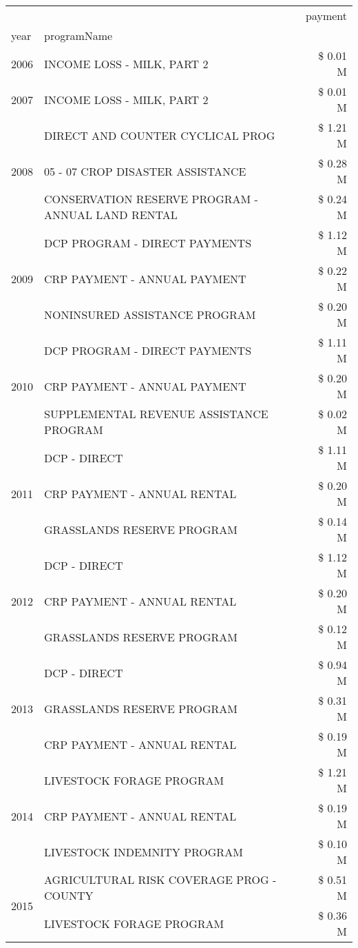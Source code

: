 \begin{tabular}{llr}
\toprule
 &  & payment \\
year & programName &  \\
\midrule
2006 & INCOME LOSS - MILK, PART 2 & \$ 0.01 M \\
\cline{1-3}
2007 & INCOME LOSS - MILK, PART 2 & \$ 0.01 M \\
\cline{1-3}
\multirow[t]{3}{*}{2008} & DIRECT AND COUNTER CYCLICAL PROG & \$ 1.21 M \\
 & 05 - 07 CROP DISASTER ASSISTANCE & \$ 0.28 M \\
 & CONSERVATION RESERVE PROGRAM - ANNUAL LAND RENTAL & \$ 0.24 M \\
\cline{1-3}
\multirow[t]{3}{*}{2009} & DCP PROGRAM - DIRECT PAYMENTS & \$ 1.12 M \\
 & CRP PAYMENT - ANNUAL PAYMENT & \$ 0.22 M \\
 & NONINSURED ASSISTANCE PROGRAM & \$ 0.20 M \\
\cline{1-3}
\multirow[t]{3}{*}{2010} & DCP PROGRAM - DIRECT PAYMENTS & \$ 1.11 M \\
 & CRP PAYMENT - ANNUAL PAYMENT & \$ 0.20 M \\
 & SUPPLEMENTAL REVENUE ASSISTANCE PROGRAM & \$ 0.02 M \\
\cline{1-3}
\multirow[t]{3}{*}{2011} & DCP - DIRECT & \$ 1.11 M \\
 & CRP PAYMENT - ANNUAL RENTAL & \$ 0.20 M \\
 & GRASSLANDS RESERVE PROGRAM & \$ 0.14 M \\
\cline{1-3}
\multirow[t]{3}{*}{2012} & DCP - DIRECT & \$ 1.12 M \\
 & CRP PAYMENT - ANNUAL RENTAL & \$ 0.20 M \\
 & GRASSLANDS RESERVE PROGRAM & \$ 0.12 M \\
\cline{1-3}
\multirow[t]{3}{*}{2013} & DCP - DIRECT & \$ 0.94 M \\
 & GRASSLANDS RESERVE PROGRAM & \$ 0.31 M \\
 & CRP PAYMENT - ANNUAL RENTAL & \$ 0.19 M \\
\cline{1-3}
\multirow[t]{3}{*}{2014} & LIVESTOCK FORAGE PROGRAM & \$ 1.21 M \\
 & CRP PAYMENT - ANNUAL RENTAL & \$ 0.19 M \\
 & LIVESTOCK INDEMNITY PROGRAM & \$ 0.10 M \\
\cline{1-3}
\multirow[t]{3}{*}{2015} & AGRICULTURAL RISK COVERAGE PROG - COUNTY & \$ 0.51 M \\
 & LIVESTOCK FORAGE PROGRAM & \$ 0.36 M \\

\end{tabular}
